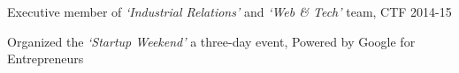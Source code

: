 \begin{cventries}
\begin{adjustwidth}{1mm}{0mm}
{\begin{cvitems}
          \item{Executive member of \textit{‘Industrial Relations’} and \textit{‘Web \& Tech’} team, CTF 2014-15}
          \item{Organized the \textit{‘Startup Weekend’} a three-day event, Powered by Google for Entrepreneurs}
        \end{cvitems}
      }
      \vspace{-1mm}
    \end{adjustwidth}
\end{cventries}
